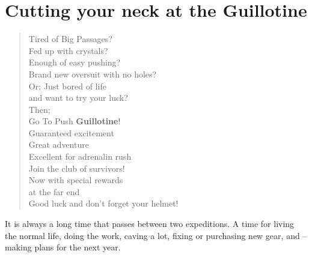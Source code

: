 \section{Cutting your neck at the Guillotine}


\begin{verse}
\begin{centering}
Tired of Big Passages? \\
Fed up with crystals? \\
Enough of easy pushing? \\
Brand new oversuit with no holes? \\

Or; Just bored of life \\
   and want to try your luck? \\

Then; \\ 

Go To Push \textbf{Guillotine}! \\

Guaranteed excitement \\
Great adventure \\
Excellent for adrenalin rush \\

Join the club of survivors! \\

Now with special rewards \\
at the far end \\

Good luck and don't forget your helmet!\\
 \end{centering} 
\end{verse}




It is always a long time that passes between two expeditions. A time for
living the normal life, doing the work, caving a lot, fixing or
purchasing new gear, and -- making plans for the next year.

